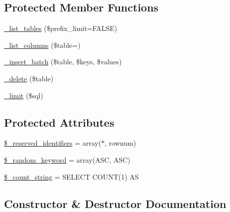 \subsection*{Protected Member Functions}
\begin{DoxyCompactItemize}
\item 
\mbox{\hyperlink{class_c_i___d_b__pdo__oci__driver_a435c0f3ce54fe7daa178baa8532ebd54}{\+\_\+list\+\_\+tables}} (\$prefix\+\_\+limit=F\+A\+L\+SE)
\item 
\mbox{\hyperlink{class_c_i___d_b__pdo__oci__driver_a7ccb7f9c301fe7f0a9db701254142b63}{\+\_\+list\+\_\+columns}} (\$table=\textquotesingle{}\textquotesingle{})
\item 
\mbox{\hyperlink{class_c_i___d_b__pdo__oci__driver_a1978e1358c812587a46e242630365099}{\+\_\+insert\+\_\+batch}} (\$table, \$keys, \$values)
\item 
\mbox{\hyperlink{class_c_i___d_b__pdo__oci__driver_a133ea8446ded52589bd22cc9163d0896}{\+\_\+delete}} (\$table)
\item 
\mbox{\hyperlink{class_c_i___d_b__pdo__oci__driver_a3a02ea06541b8ecc25a33a61651562c8}{\+\_\+limit}} (\$sql)
\end{DoxyCompactItemize}
\subsection*{Protected Attributes}
\begin{DoxyCompactItemize}
\item 
\mbox{\hyperlink{class_c_i___d_b__pdo__oci__driver_aa3298c4c62fbee8bb09f1b75b633fb0d}{\$\+\_\+reserved\+\_\+identifiers}} = array(\textquotesingle{}$\ast$\textquotesingle{}, \textquotesingle{}rownum\textquotesingle{})
\item 
\mbox{\hyperlink{class_c_i___d_b__pdo__oci__driver_a10213aa6e05f6d924d3277bb1d2fea00}{\$\+\_\+random\+\_\+keyword}} = array(\textquotesingle{}A\+SC\textquotesingle{}, \textquotesingle{}A\+SC\textquotesingle{})
\item 
\mbox{\hyperlink{class_c_i___d_b__pdo__oci__driver_a06c80bac2ecbd0557827e96949c23097}{\$\+\_\+count\+\_\+string}} = \textquotesingle{}S\+E\+L\+E\+CT C\+O\+U\+NT(1) AS \textquotesingle{}
\end{DoxyCompactItemize}


\subsection{Constructor \& Destructor Documentation}
\mbox{\label{class_c_i___d_b__pdo__oci__driver_a9162320adff1a1a4afd7f2372f753a3e}} 
